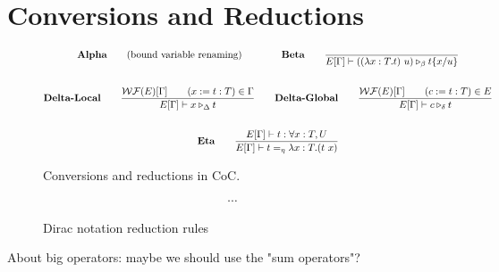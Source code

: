 \documentclass{article}
\begin{document}
\section{Conversions and Reductions}
\begin{figure}[h]
    \begin{gather*}
        \textbf{Alpha} \qquad \text{(bound variable renaming)}
        \qquad \qquad
        \textbf{Beta} \qquad
        \frac{}{E[\Gamma] \vdash ((\lambda x:T.t)\ u) \triangleright_\beta t\{x/u\}} \\
        \\
        \textbf{Delta-Local} \qquad
        \frac{\mathcal{WF}(E)[\Gamma] \qquad (x:=t:T) \in \Gamma}{E[\Gamma] \vdash x \triangleright_\Delta t} 
        \qquad
        \textbf{Delta-Global} \qquad
        \frac{\mathcal{WF}(E)[\Gamma] \qquad (c:=t:T) \in E}{E[\Gamma] \vdash c \triangleright_\delta t} \\
        \\
        \textbf{Eta} \qquad
        \frac{E[\Gamma]\vdash t : \forall x : T , U}{E[\Gamma] \vdash t =_\eta \lambda x : T . (t\ x)}
    \end{gather*}
    \caption{Conversions and reductions in CoC.}
\end{figure}

\begin{figure}[h]
    \begin{gather*}
        \cdots
    \end{gather*}
    \caption{Dirac notation reduction rules}
\end{figure}

About big operators: maybe we should use the "sum operators"?

\clearpage



\end{document}
